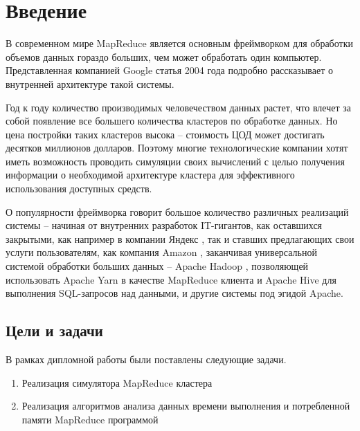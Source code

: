 \documentclass[../diploma.tex]{subfile}
\begin{document}
    \section{Введение}\label{sec:introduction}

    В современном мире MapReduce является основным фреймворком для обработки
    объемов данных гораздо больших, чем может обработать один компьютер.
    Представленная компанией Google статья \cite{google_mapreduce} 2004 года
    подробно рассказывает о внутренней архитектуре такой системы. 

    Год к году количество производимых человечеством данных растет, что влечет
    за собой появление все большего количества кластеров по обработке данных. Но
    цена постройки таких кластеров высока -- стоимость ЦОД может достигать
    десятков миллионов долларов. Поэтому многие технологические компании хотят
    иметь возможность проводить симуляции своих вычислений с целью получения
    информации о необходимой архитектуре кластера для эффективного использования
    доступных средств.

    О популярности фреймворка говорит большое количество различных реализаций
    системы -- начиная от внутренних разработок IT-гигантов, как оставшихся
    закрытыми, как например в компании Яндекс \cite{yandex_yt}, так и ставших
    предлагающих свои услуги пользователям, как компания Amazon
    \cite{amazon_emr}, заканчивая универсальной системой обработки больших
    данных -- Apache Hadoop \cite{apache_hadoop}, позволяющей использовать
    Apache Yarn \cite{apache_yarn} в качестве MapReduce клиента и Apache Hive
    \cite{apache_hive} для выполнения SQL-запросов над данными, и другие системы
    под эгидой Apache. 
    

    \subsection{Цели и задачи}\label{subsec:goals}

    В рамках дипломной работы были поставлены следующие задачи.

    \begin{enumerate}
        \item Реализация симулятора MapReduce кластера
        \item Реализация алгоритмов анализа данных времени выполнения и
        потребленной памяти MapReduce программой
    \end{enumerate}
\end{document}
